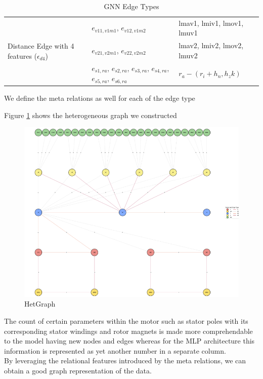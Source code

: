 \documentclass{report} %
\begin{document}
\begin{enumerate}
\begin{table}[H]
\begin{tabular}{|p{}|p{}|p{}|}
        \hline
        \multirow{3}{0.2\textwidth}{Distance Edge with 4 features (\( \epsilon_{d4} \))} & \( e_{v11, v1m1} \), \( e_{v12, v1m2} \) & lmav1, lmiv1, lmov1, lmuv1 \\
                                            &  \( e_{v21, v2m1} \), \( e_{v22, v2m2} \) & lmav2, lmiv2, lmov2, lmuv2 \\
                                            &  \( e_{s1, ra} \), \( e_{s2, ra} \), \( e_{s3, ra} \), \( e_{s4, ra} \), \( e_{s5, ra} \), \( e_{s6, ra} \)   &  \(r_a - (r_i + h_n, h_zk) \)\\

        \hline
        \end{tabular}
        \caption{\ac{GNN} Edge Types}
        \label{tab:GNN Edge Types}
    \end{table}

    We define the meta relations as well for each of the edge type

\end{enumerate}

Figure \ref{fig:HetGraph} shows the heterogeneous graph we constructed
\begin{figure}[H]
    \centering
    \includegraphics[width=1\textwidth]{./ReportImages/graph.png} 
    \caption{HetGraph}
    \label{fig:HetGraph}
\end{figure}
The count of certain parameters within the motor such as stator poles with its corresponding stator windings and rotor magnets is made more comprehendable to the 
model having new nodes and edges whereas for the \ac{MLP} architecture this information is represented as yet another number in a separate column. \\
By leveraging the relational features introduced by the meta relations, we can obtain a good graph representation of the data.\\
\end{document}
